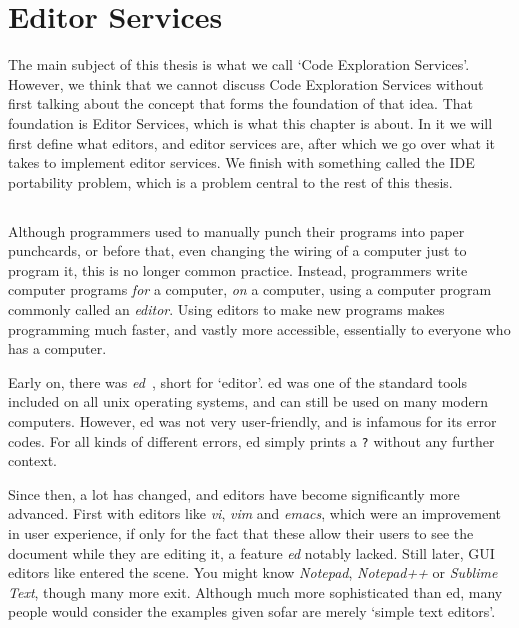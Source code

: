 

\chapter{Editor Services}
\label{chap:editor-services}

The main subject of this thesis is what we call `Code Exploration Services'.
However, we think that we cannot discuss Code Exploration Services without first talking about the concept that forms the foundation of that idea.
That foundation is Editor Services, which is what this chapter is about.
In it we will first define what editors, and editor services are, after which we go over what it takes to implement editor services.
We finish with something called the \ac{IDE} portability problem, which is a problem central to the rest of this thesis.

\section*{}

Although programmers used to manually punch their programs into paper punchcards,
or before that, even changing the wiring of a computer just to program it, this is no longer common practice.
Instead, programmers write computer programs \emph{for} a computer, \emph{on} a computer, using a computer program commonly called an \emph{editor}.
Using editors to make new programs makes programming much faster, and vastly more accessible, essentially to everyone who has a computer.

Early on, there was \emph{ed}~\autocite{ed}, short for `editor'.
ed was one of the standard tools included on all unix operating systems, and can still be used on many modern computers.
However, ed was not very user-friendly, and is infamous for its error codes.
For all kinds of different errors, ed simply prints a \texttt{?} without any further context.

Since then, a lot has changed, and editors have become significantly more advanced.
First with editors like \emph{vi}, \emph{vim} and \emph{emacs}, which were an improvement in user experience, if only for the
fact that these allow their users to see the document while they are editing it, a feature \emph{ed} notably lacked.
Still later, \ac{GUI} editors like entered the scene.
You might know \emph{Notepad}, \emph{Notepad++} or \emph{Sublime Text}, though many more exit.
Although much more sophisticated than ed, many people would consider the examples given sofar are merely `simple text editors'.

